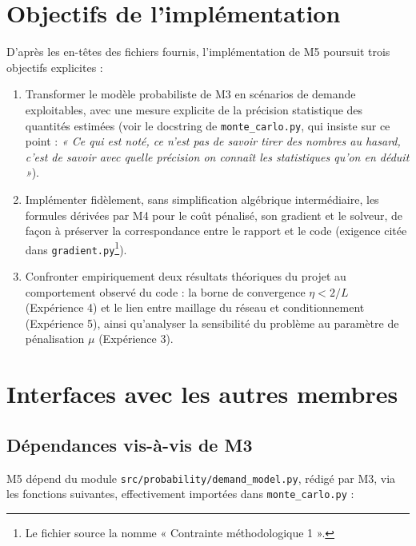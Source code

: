\documentclass[11pt,a4paper]{article}
\begin{document}
\section{Objectifs de l'implémentation}

D'après les en-têtes des fichiers fournis, l'implémentation de M5 poursuit
trois objectifs explicites :

\begin{enumerate}
  \item Transformer le modèle probabiliste de M3 en scénarios de demande
  exploitables, avec une mesure explicite de la précision statistique des
  quantités estimées (voir le docstring de \texttt{monte\_carlo.py}, qui
  insiste sur ce point : \emph{« Ce qui est noté, ce n'est pas de savoir
  tirer des nombres au hasard, c'est de savoir avec quelle précision on
  connaît les statistiques qu'on en déduit »}).
  \item Implémenter fidèlement, sans simplification algébrique
  intermédiaire, les formules dérivées par M4 pour le coût pénalisé, son
  gradient et le solveur, de façon à préserver la correspondance entre le
  rapport et le code (exigence citée dans \texttt{gradient.py}\footnote{Le
  fichier source la nomme « Contrainte méthodologique 1 ».}).
  \item Confronter empiriquement deux résultats théoriques du projet au
  comportement observé du code : la borne de convergence $\eta < 2/L$
  (Expérience 4) et le lien entre maillage du réseau et conditionnement
  (Expérience 5), ainsi qu'analyser la sensibilité du problème au paramètre
  de pénalisation $\mu$ (Expérience 3).
\end{enumerate}

\section{Interfaces avec les autres membres}

\subsection{Dépendances vis-à-vis de M3}

M5 dépend du module \texttt{src/probability/demand\_model.py}, rédigé par M3,
via les fonctions suivantes, effectivement importées dans
\texttt{monte\_carlo.py} :
\end{document}

